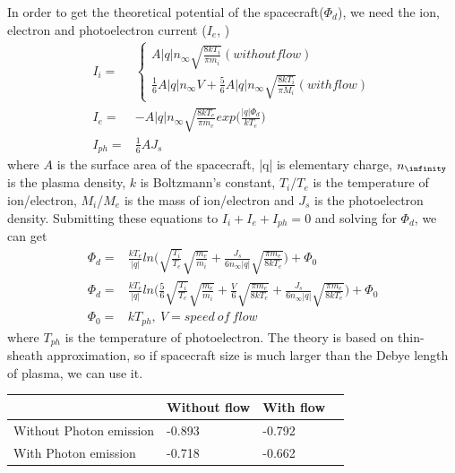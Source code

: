 In order to get the theoretical potential of the spacecraft($\Phi_d$), we need the ion, electron and photoelectron current (\(I_e\), )
\begin{equation}
\begin{split}
 I_i = &
    \left\{\begin{array}{ccc}
       A|q|n_\infty\sqrt{\frac{8 k T_i}{\pi m_i}} (without flow)\\
       \frac{1}{6}A |q|n_\infty V + \frac{5}{6} A |q| n_\infty \sqrt{\frac{8 k T_i}{\pi M_i}}(with flow)
      \end{array}\right. \\
  I_e = & -A|q|n_\infty \sqrt{\frac{8 k T_e}{\pi m_e}}exp\Big(\frac{|q|\Phi_d}{k T_e}\Big)\\
  I_{ph} = & \frac{1}{6} AJ_s
\end{split}
\label{thin sheet potential}
\end{equation}
where \(A\) is the surface area of the spacecraft, |q| is elementary charge, \(n_\infinity\) is the plasma density, \(k\) is Boltzmann's constant, \(T_i\)/\(T_e\) is the temperature of ion/electron, \(M_i\)/\(M_e\) is the mass of ion/electron and \(J_s\) is the photoelectron density.
Submitting these equations to \(I_i+I_e+I_{ph}=0\) and solving for $\Phi_d$, we can get
\begin{equation}
\begin{split}
 \Phi_d = & \frac{k T_e}{|q|}ln\Big(\sqrt{\frac{T_i}{T_e}}\sqrt{\frac{m_e}{m_i}}+\frac{J_s}{6 n_\infty |q|}\sqrt{\frac{\pi m_e}{8 k T_e}}\Big) + \Phi_0 \\
 \Phi_d = & \frac{k T_e}{|q|}ln\Big(\frac{5}{6}\sqrt{\frac{T_i}{T_e}}\sqrt{\frac{m_e}{m_i}}+\frac{V}{6}\sqrt{\frac{\pi m_e}{8 k T_e}} + \frac{J_s}{6 n_\infty |q|}\sqrt{\frac{\pi m_e}{8 k T_e}} \Big)+\Phi_0 \\
 \Phi_0 = & k T_{ph}, \ V = speed\ of\ flow
\end{split}
\label{thin sheet potential 2}
\end{equation}
where \(T_{ph}\) is the temperature of photoelectron.
The theory is based on thin-sheath approximation, so if spacecraft size is much larger than the Debye length of plasma, we can use it.\\

\begin{center}
    \begin{tabular}{ | l | l | l | p{5cm} |}
    \hline
     & Without flow & With flow  \\ \hline
     Without Photon emission & -0.893   & -0.792 \\ \hline
     With Photon emission & -0.718 & -0.662 \\
    \hline
    \end{tabular}
\end{center}

